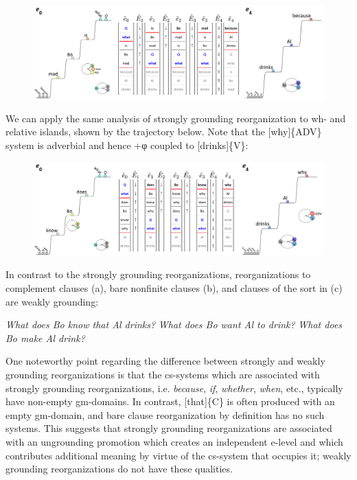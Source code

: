   
\begin{figure}
\includegraphics[width=\textwidth]{figures/Tilsen-img163.png}
\caption{\missingcaption}
\label{fig:}
\end{figure}
 

  We can apply the same analysis of strongly grounding reorganization to wh- and relative islands, shown by the trajectory below. Note that the [why]\{ADV\} system is adverbial and hence +φ coupled to [drinks]\{V\}:

  
\begin{figure}
\includegraphics[width=\textwidth]{figures/Tilsen-img164.png}
\caption{\missingcaption}
\label{fig:}
\end{figure}
 

  In contrast to the strongly grounding reorganizations, reorganizations to complement clauses (a), bare nonfinite clauses (b), and clauses of the sort in (c) are weakly grounding:

  \ea
  \ea \textit{What does Bo know that Al drinks?}
\ex \textit{What does Bo want Al to drink?}
\ex  \textit{What does Bo make Al drink?}
\z
\z

  One noteworthy point regarding the difference between strongly and weakly grounding reorganizations is that the cs-systems which are associated with strongly grounding reorganizations, i.e. \textit{because}, \textit{if}, \textit{whether}, \textit{when}, etc., typically have non-empty gm-domains. In contrast, [that]\{C\} is often produced with an empty gm-domain, and bare clause reorganization by definition has no such systems. This suggests that strongly grounding reorganizations are associated with an ungrounding promotion which creates an independent e-level and which contributes additional meaning by virtue of the cs-system that occupies it; weakly grounding reorganizations do not have these qualities.

